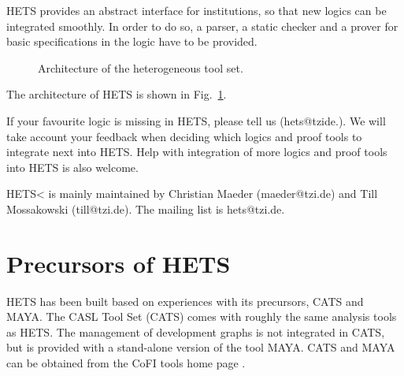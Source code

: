 \documentclass{article}
\newcommand{\normalTEXTSC}[2]{{#1\scriptsize#2}}
\newcommand     {\CASL}{\normalTEXTSC{C}{ASL}\xspace}
\newcommand     {\CoFI}{CoFI\xspace}
\newcommand     {\MAYA}{\normalTEXTSC{M}{AYA}\xspace}
\newcommand     {\Hets}{\normalTEXTSC{H}{ETS}\xspace}
\newcommand     {\Cats}{\normalTEXTSC{C}{ATS}\xspace}
\begin{document}
\Hets provides an abstract interface for 
institutions, so
that new logics can be integrated smoothly. 
In order to do so, a parser,
a static checker and a prover for basic specifications in the logic have
to be provided.



\begin{figure}
\vspace{1em}

\caption{Architecture of the heterogeneous tool set.
\label{fig:hets}}
\end{figure}

The architecture of \Hets is shown in Fig.~\ref{fig:hets}. 

If your favourite logic is missing in \Hets, please tell us
(hets@tzide.). We will take account your feedback when deciding which
logics and proof tools to integrate next into \Hets. Help with
integration of more logics and proof tools into \Hets is also welcome.

\Hets< is mainly maintained by
Christian Maeder (maeder@tzi.de) and Till Mossakowski
(till@tzi.de). The mailing list is hets@tzi.de.

\section{Precursors of \Hets}

\Hets has been built based on experiences with its
precursors, 
                \index{Cats@\Cats}%
\Cats and 
                \index{Maya@\MAYA}%
\MAYA.
The \CASL Tool Set (\Cats) 
\cite{Mossakowski:2000:CST,Mossakowski:1998:SSA}
comes with roughly the same analysis tools as \Hets.
The management of development graphs is not integrated
in \Cats, 
but is provided with a stand-alone version of the
tool \MAYA \cite{Autexier:2002:IHD,AutexierEtal02}. 
%
\Cats and \MAYA 
 can be obtained from the \CoFI tools home page \cite{CoFITools}.
\end{document}
